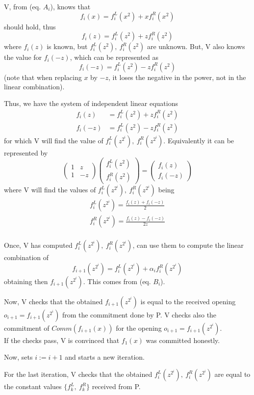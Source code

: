 \documentclass{article}
\theoremstyle{definition}
\begin{document}
V, from (eq. $A_i$), knows that
$$f_i(x)=f_i^L(x^2) + x f_i^R(x^2)$$
should hold, thus
$$f_i(z)=f_i^L(z^2) + z f_i^R(z^2)$$
where $f_i(z)$ is known, but $f_i^L(z^2),~f_i^R(z^2)$ are unknown.
But, V also knows the value for $f_i(-z)$, which can be represented as
$$f_i(-z)=f_i^L(z^2) - z f_i^R(z^2)$$
(note that when replacing $x$ by $-z$, it loses the negative in the power, not in the linear combination).

Thus, we have the system of independent linear equations
\begin{align*} %
	f_i(z)&=f_i^L(z^2) + z f_i^R(z^2)\\
	f_i(-z)&=f_i^L(z^2) - z f_i^R(z^2)
\end{align*}
for which V will find the value of $f_i^L(z^{2^i}),~f_i^R(z^{2^i})$.
Equivalently it can be represented by
$$
\begin{pmatrix}
	1 & z\\
	1 & -z
\end{pmatrix}
\begin{pmatrix}
	f_i^L(z^2)\\
	f_i^R(z^2)
\end{pmatrix}
=
\begin{pmatrix}
	f_i(z)\\
	f_i(-z)
\end{pmatrix}
$$
where V will find the values of $f_i^L(z^{2^i}),~f_i^R(z^{2^i})$ being
\begin{align*}
	f_i^L(z^{2^i})=\frac{f_i(z) + f_i(-z)}{2}\\
	f_i^R(z^{2^i})=\frac{f_i(z) - f_i(-z)}{2z}\\
\end{align*}

Once, V has computed $f_i^L(z^{2^i}),~f_i^R(z^{2^i})$, can use them to compute the linear combination of
$$
f_{i+1}(z^{2^i}) = f_i^L(z^{2^i}) + \alpha_i f_i^R(z^{2^i})
$$
obtaining then $f_{i+1}(z^{2^i})$. This comes from (eq. $B_i$).

Now, V checks that the obtained $f_{i+1}(z^{2^i})$ is equal to the received opening $o_{i+1}=f_{i+1}(z^{2^i})$ from the commitment done by P.
V checks also the commitment of $Comm(f_{i+1}(x))$ for the opening $o_{i+1}=f_{i+1}(z^{2^i})$.\\
If the checks pass, V is convinced that $f_1(x)$ was committed honestly.

Now, sets $i := i+1$ and starts a new iteration.

For the last iteration, V checks that the obtained $f_i^L(z^{2^i}),~f_i^R(z^{2^i})$ are equal to the constant values $\{f_k^L,~f_k^R\}$ received from P.
\end{document}
